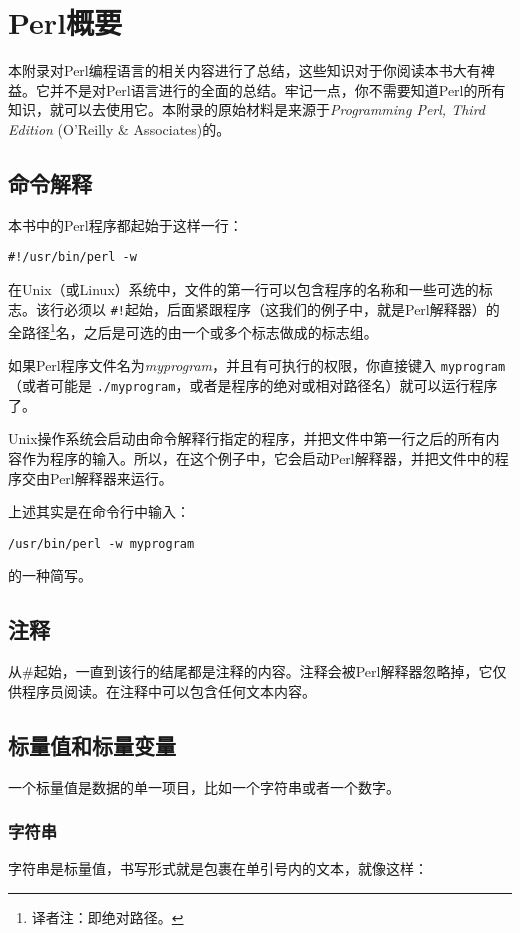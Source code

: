 \chapter{Perl概要}
\label{chap:chapterab}
\minitoc

本附录对Perl编程语言的相关内容进行了总结，这些知识对于你阅读本书大有裨益。它并不是对Perl语言进行的全面的总结。牢记一点，你不需要知道Perl的所有知识，就可以去使用它。本附录的原始材料是来源于\textit{Programming Perl, Third Edition} (O'Reilly \& Associates)的。

\section{命令解释}
本书中的Perl程序都起始于这样一行：

\begin{lstlisting}
#!/usr/bin/perl -w
\end{lstlisting}

在Unix（或Linux）系统中，文件的第一行可以包含程序的名称和一些可选的标志。该行必须以 \verb|#!|起始，后面紧跟程序（这我们的例子中，就是Perl解释器）的全路径\footnote{译者注：即绝对路径。}名，之后是可选的由一个或多个标志做成的标志组。

如果Perl程序文件名为\textit{myprogram}，并且有可执行的权限，你直接键入 \verb|myprogram|（或者可能是 \verb|./myprogram|，或者是程序的绝对或相对路径名）就可以运行程序了。

Unix操作系统会启动由命令解释行指定的程序，并把文件中第一行之后的所有内容作为程序的输入。所以，在这个例子中，它会启动Perl解释器，并把文件中的程序交由Perl解释器来运行。

上述其实是在命令行中输入：

\begin{lstlisting}
/usr/bin/perl -w myprogram 
\end{lstlisting}

的一种简写。

\section{注释}
从\#起始，一直到该行的结尾都是注释的内容。注释会被Perl解释器忽略掉，它仅供程序员阅读。在注释中可以包含任何文本内容。

\section{标量值和标量变量}
一个标量值是数据的单一项目，比如一个字符串或者一个数字。

\subsection{字符串}
字符串是标量值，书写形式就是包裹在单引号内的文本，就像这样：

